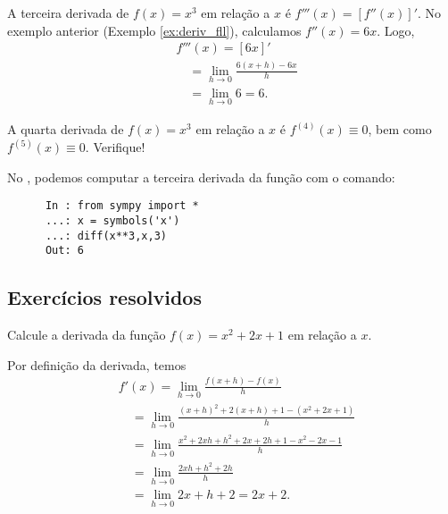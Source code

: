 \begin{ex}
  A terceira derivada de $f(x) = x^3$ em relação a $x$ é $f'''(x) = [f''(x)]'$. No exemplo anterior (Exemplo \ref{ex:deriv_fll}), calculamos $f''(x) = 6x$. Logo,
    \begin{align}
      & f'''(x) = [6x]' \\
      & \text{}\quad = \lim_{h\to 0} \frac{6(x+h)-6x}{h} \\
      & \text{}\quad = \lim_{h\to 0} 6 = 6.
    \end{align}

    A quarta derivada de $f(x) = x^3$ em relação a $x$ é $f^{(4)}(x) \equiv 0$, bem como $f^{(5)}(x) \equiv 0$. Verifique!

    \ifispython
    No \sympy, podemos computar a terceira derivada da função com o comando:
    \begin{lstlisting}
      In : from sympy import *
      ...: x = symbols('x')
      ...: diff(x**3,x,3)
      Out: 6
    \end{lstlisting}
  \fi  
\end{ex}


\subsection{Exercícios resolvidos}

\begin{exeresol}
  Calcule a derivada da função $f(x) = x^2 + 2x + 1$ em relação a $x$.
\end{exeresol}
\begin{resol}
  Por definição da derivada, temos
  \begin{align}
    & f'(x) = \lim_{h\to 0} \frac{f(x+h)-f(x)}{h}\\
    & \text{}\quad = \lim_{h\to 0} \frac{(x+h)^2 + 2(x+h) + 1 - (x^2+2x+1)}{h}\\
    & \text{}\quad = \lim_{h\to 0} \frac{x^2+2xh+h^2+2x+2h+1-x^2-2x-1}{h}\\
    & \text{}\quad = \lim_{h\to 0} \frac{2xh+h^2+2h}{h}\\
    & \text{}\quad = \lim_{h\to 0} 2x+h+2 = 2x+2.
  \end{align}
\end{resol}

